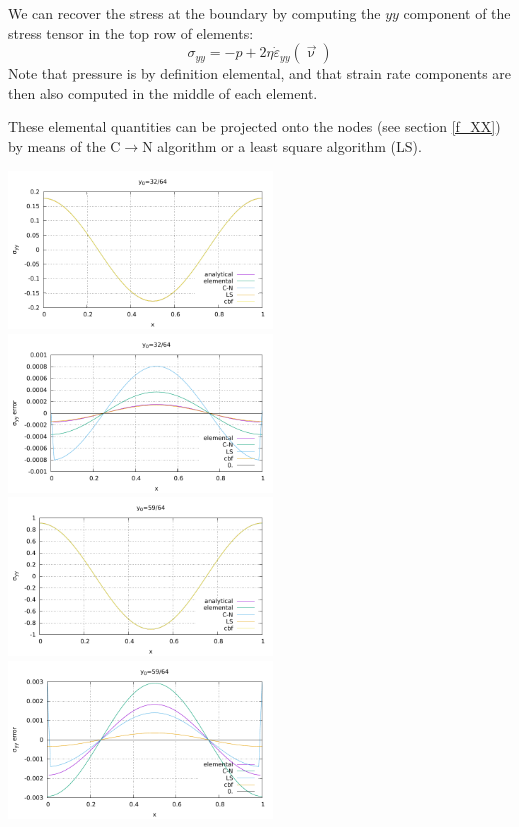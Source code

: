 We can recover the stress at the boundary by computing 
the $yy$ component of the stress tensor in the top row of elements: 
\[
\sigma_{yy} = -p + 2 \eta \dot{\varepsilon}_{yy}(\vec\upnu)
\]
Note that pressure is by definition elemental, and that strain rate
components are then also computed in the middle of each element.

These elemental quantities can be projected onto the nodes (see section \ref{f_XX})
by means of the C$\rightarrow$N algorithm or a least square algorithm (LS). 

\begin{center}
\includegraphics[width=7cm]{python_codes/fieldstone_27/results/32_64/sigmazz.pdf}
\includegraphics[width=7cm]{python_codes/fieldstone_27/results/32_64/sigmazz_error.pdf}\\
\includegraphics[width=7cm]{python_codes/fieldstone_27/results/59_64/sigmazz.pdf}
\includegraphics[width=7cm]{python_codes/fieldstone_27/results/59_64/sigmazz_error.pdf}\\

\end{center}
